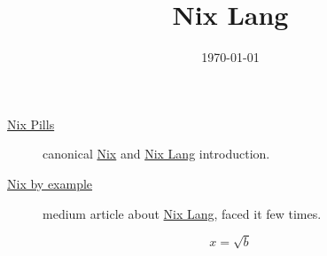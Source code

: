 \documentclass[11pt]{article}
\date{\today}
\title{Nix Lang}
\begin{document}
\maketitle
\tableofcontents

\begin{description}
\item[{\href{https://nixos.org/nixos/nix-pills/why-you-should-give-it-a-try.html}{Nix Pills}}] canonical \href{20200620142500-nix.org}{Nix} and \href{20200723102251-nix\_lang.org}{Nix Lang} introduction.
\item[{\href{https://medium.com/@MrJamesFisher/nix-by-example-a0063a1a4c55}{Nix by example}}] medium article about \href{20200723102251-nix\_lang.org}{Nix Lang}, faced it few times.
\end{description}

\begin{equation}                        %
x=\sqrt{b}                              %
\end{equation}
\end{document}
